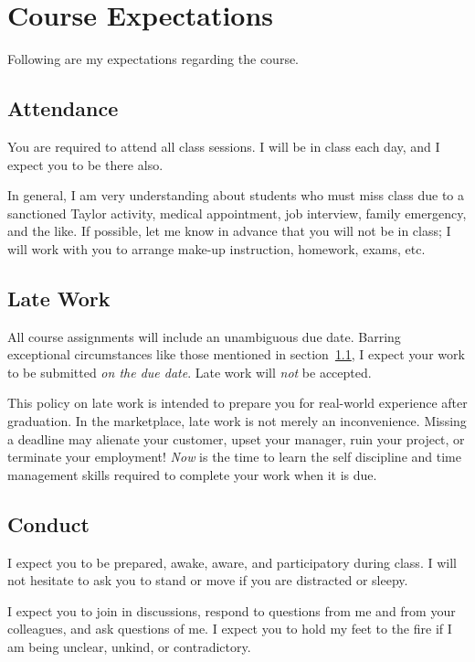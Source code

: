 \documentclass[11pt]{article}
\begin{document}
\section{Course Expectations}

Following are my expectations regarding the course.

\subsection{Attendance}
\label{sec:attendance}

You are required to attend all class sessions.
I will be in class each day, and I expect you to be there also.

In general, I am very understanding about students who must miss class
due to a sanctioned Taylor activity, medical appointment, job interview,
family emergency, and the like.
If possible, let me know in advance that you will not be in class;
I will work with you to arrange make-up instruction, homework, exams, etc.

\subsection{Late Work}

All course assignments will include an unambiguous due date.
Barring exceptional circumstances like those mentioned in section~\ref{sec:attendance},
I expect your work to be submitted \emph{on the due date}.
Late work will \emph{not} be accepted.

This policy on late work is intended to prepare you
for real-world experience after graduation.
In the marketplace,
late work is not merely an inconvenience.
Missing a deadline may
alienate your customer,
upset your manager,
ruin your project,
or terminate your employment!
\emph{Now} is the time to learn the self discipline and time management skills
required to complete your work when it is due.

\subsection{Conduct}

I expect you to be prepared, awake, aware, and participatory during class. I will not
hesitate to ask you to stand or move if you are distracted or sleepy.

I expect you to join in discussions, respond to questions from me and from your
colleagues, and ask questions of me. I expect you to hold my feet to the fire if I am
being unclear, unkind, or contradictory.
\end{document}
